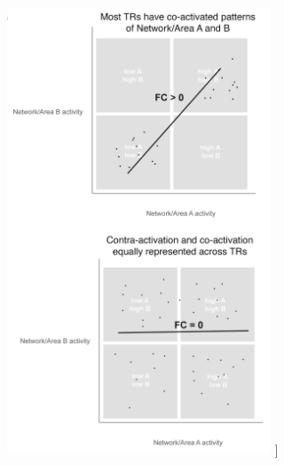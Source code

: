 \documentclass[phd,tocprelim]{cornell}
\renewcommand{\caption}[1]{\singlespacing\hangcaption{#1}\normalspacing}
\begin{document}
\null
\vfill
\clearpage
\null
\vfill
\begin{figure}[h!]
		\ContinuedFloat
		\captionsetup{labelformat=adja-page}
    \centering
    \includegraphics[width=0.7\textwidth]{chapter2/SupplementaryFig15c.png}
    \caption[]{}
\end{figure}
\null
\vfill
\clearpage

\printbibliography
\end{document}
